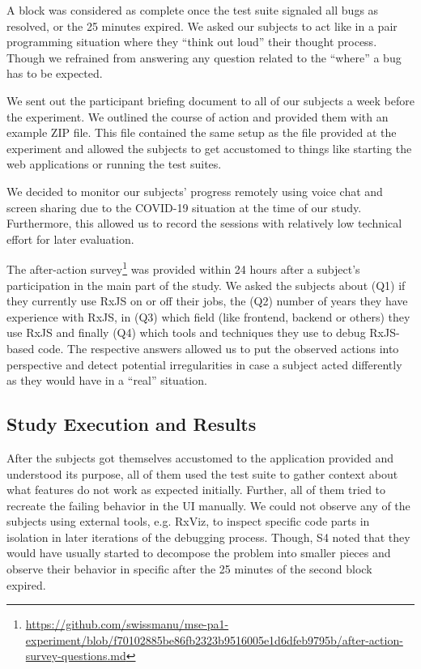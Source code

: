 \documentclass[sigplan,screen,review]{acmart}
\begin{document}
A block was considered as complete once the test suite signaled all bugs as resolved, or the 25 minutes expired. We asked our subjects to act like in a pair programming situation where they ``think out loud'' their thought process. Though we refrained from answering any question related to the ``where'' a bug has to be expected.

We sent out the participant briefing document to all of our subjects a week before the experiment. We outlined the course of action and provided them with an example ZIP file. This file contained the same setup as the file provided at the experiment and allowed the subjects to get accustomed to things like starting the web applications or running the test suites.

We decided to monitor our subjects' progress remotely using voice chat and screen sharing due to the COVID-19 situation at the time of our study. Furthermore, this allowed us to record the sessions with relatively low technical effort for later evaluation.

The after-action survey\footnote{\url{https://github.com/swissmanu/mse-pa1-experiment/blob/f70102885be86fb2323b9516005e1d6dfeb9795b/after-action-survey-questions.md}} was provided within 24 hours after a subject's participation in the main part of the study. We asked the subjects about (Q1) if they currently use RxJS on or off their jobs, the (Q2) number of years they have experience with RxJS, in (Q3) which field (like frontend, backend or others) they use RxJS and finally (Q4) which tools and techniques they use to debug RxJS-based code. The respective answers allowed us to put the observed actions into perspective and detect potential irregularities in case a subject acted differently as they would have in a ``real'' situation.

\subsection{Study Execution and Results}

After the subjects got themselves accustomed to the application provided and understood its purpose, all of them used the test suite to gather context about what features do not work as expected initially. Further, all of them tried to recreate the failing behavior in the UI manually. We could not observe any of the subjects using external tools, e.g. RxViz, to inspect specific code parts in isolation in later iterations of the debugging process. Though, S4 noted that they would have usually started to decompose the problem into smaller pieces and observe their behavior in specific after the 25 minutes of the second block expired.
\end{document}
